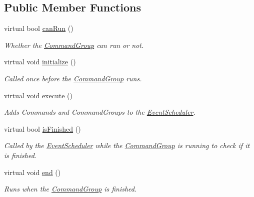 \subsection*{Public Member Functions}
\begin{DoxyCompactItemize}
\item 
virtual bool \mbox{\hyperlink{classlib_iterative_robot_1_1_command_group_abd75c9b52e6b4ae5af1b6724e865311f}{can\+Run}} ()
\begin{DoxyCompactList}\small\item\em Whether the \mbox{\hyperlink{classlib_iterative_robot_1_1_command_group}{Command\+Group}} can run or not. \end{DoxyCompactList}\item 
virtual void \mbox{\hyperlink{classlib_iterative_robot_1_1_command_group_a99800c5dbd05ab750aa0bb27518d0467}{initialize}} ()
\begin{DoxyCompactList}\small\item\em Called once before the \mbox{\hyperlink{classlib_iterative_robot_1_1_command_group}{Command\+Group}} runs. \end{DoxyCompactList}\item 
virtual void \mbox{\hyperlink{classlib_iterative_robot_1_1_command_group_a5e91d370cafde43548d79945ccb4d8fe}{execute}} ()
\begin{DoxyCompactList}\small\item\em Adds Commands and Command\+Groups to the \mbox{\hyperlink{classlib_iterative_robot_1_1_event_scheduler}{Event\+Scheduler}}. \end{DoxyCompactList}\item 
virtual bool \mbox{\hyperlink{classlib_iterative_robot_1_1_command_group_a96807a2763adf9e21ebf2cb9e3574e3c}{is\+Finished}} ()
\begin{DoxyCompactList}\small\item\em Called by the \mbox{\hyperlink{classlib_iterative_robot_1_1_event_scheduler}{Event\+Scheduler}} while the \mbox{\hyperlink{classlib_iterative_robot_1_1_command_group}{Command\+Group}} is running to check if it is finished. \end{DoxyCompactList}\item 
virtual void \mbox{\hyperlink{classlib_iterative_robot_1_1_command_group_a28ad3a1c2f6b4f9aea10efa1a824895e}{end}} ()
\begin{DoxyCompactList}\small\item\em Runs when the \mbox{\hyperlink{classlib_iterative_robot_1_1_command_group}{Command\+Group}} is finished. \end{DoxyCompactList}\item 

\end{DoxyCompactItemize}
